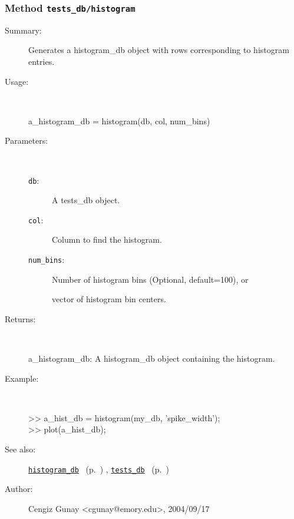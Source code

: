 \subsubsection[Method \texttt{histogram}]{Method \texttt{tests\_db/histogram}}%
%
\label{ref_tests_db__histogram}%
\hypertarget{ref_tests_db__histogram}{}%
\begin{description}
\item[Summary:]Generates a histogram\_db object with rows corresponding to 
		histogram entries.
%
\item[Usage:]~%
\begin{lyxcode}%
a\_histogram\_db = histogram(db, col, num\_bins)
%
\end{lyxcode}%
%
%
\item[Parameters:]~
\begin{description}%
\item[\texttt{db}:]
 A tests\_db object.
\item[\texttt{col}:]
 Column to find the histogram.
\item[\texttt{num\_bins}:]
 Number of histogram bins (Optional, default=100), or

vector of histogram bin centers.\end{description}%
%
\item[Returns:]~

	a\_histogram\_db: A histogram\_db object containing the histogram.
%
\item[Example:]~
\begin{lyxcode} >> a\_hist\_db = histogram(my\_db, 'spike\_width');\\%
 >> plot(a\_hist\_db);\\%
\end{lyxcode}
%
\item[See also:]%
\hyperlink{ref_histogram_db}{\texttt{histogram\_db}}%
\ (p.~\pageref{ref_histogram_db})%
%
, \hyperlink{ref_tests_db}{\texttt{tests\_db}}%
\ (p.~\pageref{ref_tests_db})%
%
%
\item[Author:]%
Cengiz Gunay <cgunay@emory.edu>, 2004/09/17%
\end{description}
\methodline%
